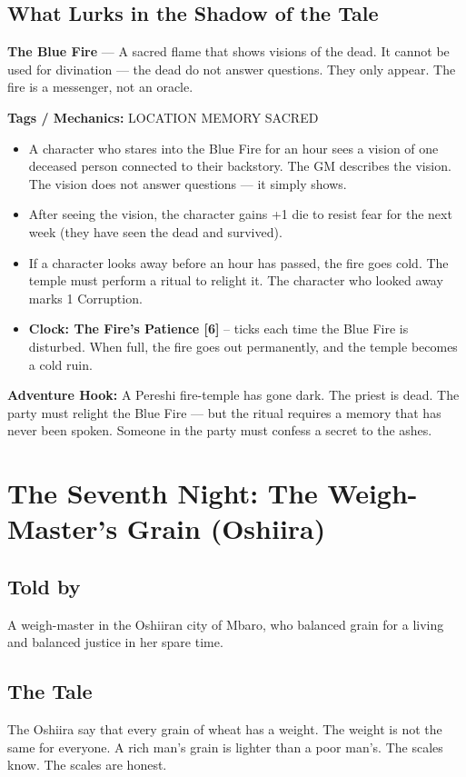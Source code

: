\documentclass[10pt,twoside]{book}
\newcommand{\tag}[1]{\textsc{#1}}
\begin{document}
\section*{What Lurks in the Shadow of the Tale}
\begin{infobox}
\textbf{The Blue Fire} --- A sacred flame that shows visions of the dead. It cannot be used for divination --- the dead do not answer questions. They only appear. The fire is a messenger, not an oracle.

\textbf{Tags / Mechanics:} \tag{LOCATION} \tag{MEMORY} \tag{SACRED}

\begin{itemize}
\item A character who stares into the Blue Fire for an hour sees a vision of one deceased person connected to their backstory. The GM describes the vision. The vision does not answer questions --- it simply shows.
\item After seeing the vision, the character gains +1 die to resist fear for the next week (they have seen the dead and survived).
\item If a character looks away before an hour has passed, the fire goes cold. The temple must perform a ritual to relight it. The character who looked away marks 1 Corruption.
\item \textbf{Clock: The Fire's Patience [6]} -- ticks each time the Blue Fire is disturbed. When full, the fire goes out permanently, and the temple becomes a cold ruin.
\end{itemize}

\textbf{Adventure Hook:} A Pereshi fire-temple has gone dark. The priest is dead. The party must relight the Blue Fire --- but the ritual requires a memory that has never been spoken. Someone in the party must confess a secret to the ashes.
\end{infobox}

\chapter{The Seventh Night: The Weigh-Master's Grain (Oshiira)}

\section*{Told by}
A weigh-master in the Oshiiran city of Mbaro, who balanced grain for a living and balanced justice in her spare time.

\section*{The Tale}
The Oshiira say that every grain of wheat has a weight. The weight is not the same for everyone. A rich man's grain is lighter than a poor man's. The scales know. The scales are honest.
\end{document}
